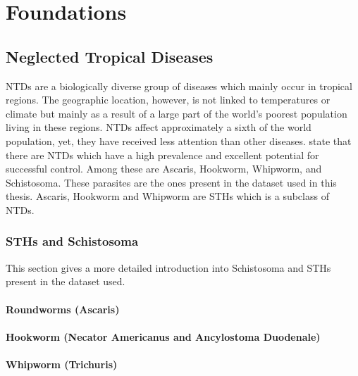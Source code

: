 \chapter{Foundations}
\label{ch:Foundations}

\section{Neglected Tropical Diseases}
\label{sec:Foundations:NTDs}

\ac{NTDs} \cite{feasey2010neglected} are a biologically diverse group of diseases which mainly occur in tropical regions. The geographic location, however, is not linked to temperatures or climate but mainly as a result of a large part of the world's poorest population living in these regions. \ac{NTDs} affect approximately a sixth of the world population, yet, they have received less attention than other diseases. \textcite{feasey2010neglected} state that there are \ac{NTDs} which have a high prevalence and excellent potential for successful control. Among these are Ascaris, Hookworm, Whipworm, and Schistosoma. These parasites are the ones present in the dataset used in this thesis. Ascaris, Hookworm and Whipworm are \ac{STHs} which is a subclass of \ac{NTDs}.

\subsection{\acl{STHs} and Schistosoma}
\label{sec:Foundations:NTDs:STHs}

This section gives a more detailed introduction into Schistosoma and \acl{STHs} present in the dataset used.


\label{sec:Foundations:NTDs:STHs}

\subsubsection{Roundworms (Ascaris)}
\label{sec:Foundations:NTDs:STHs:Ascaris}

\subsubsection{Hookworm (Necator Americanus and Ancylostoma Duodenale)}
\label{sec:Foundations:NTDs:STHs:Hookworm}

\subsubsection{Whipworm (Trichuris)}
\label{sec:Foundations:NTDs:STHs:Whipworm}

